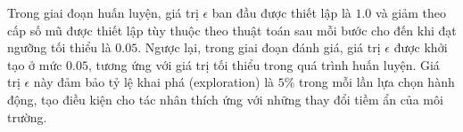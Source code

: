 Trong giai đoạn huấn luyện, giá trị $\epsilon$ ban đầu được thiết lập là $1.0$ và giảm theo cấp số mũ được thiết lập tùy thuộc theo thuật toán sau mỗi bước cho đến khi đạt ngưỡng tối thiểu là $0.05$. Ngược lại, trong giai đoạn đánh giá, giá trị $\epsilon$ được khởi tạo ở mức $0.05$, tương ứng với giá trị tối thiểu trong quá trình huấn luyện. Giá trị $\epsilon$ này đảm bảo tỷ lệ khai phá (exploration) là $5\%$ trong mỗi lần lựa chọn hành động, tạo điều kiện cho tác nhân thích ứng với những thay đổi tiềm ẩn của môi trường.